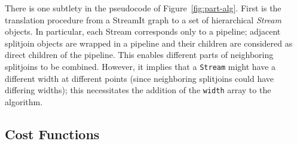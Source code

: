 There is one subtlety in the pseudocode of Figure~\ref{fig:part-alg}.
First is the translation procedure from a StreamIt graph to a set of
hierarchical {\it Stream} objects.  In particular, each Stream
corresponds only to a pipeline; adjacent splitjoin objects are wrapped
in a pipeline and their children are considered as direct children of
the pipeline. This enables different parts of neighboring splitjoins
to be combined.  However, it implies that a {\tt Stream} might have a
different width at different points (since neighboring splitjoins
could have differing widths); this necessitates the addition of the
{\tt width} array to the algorithm.

\subsection{Cost Functions}

